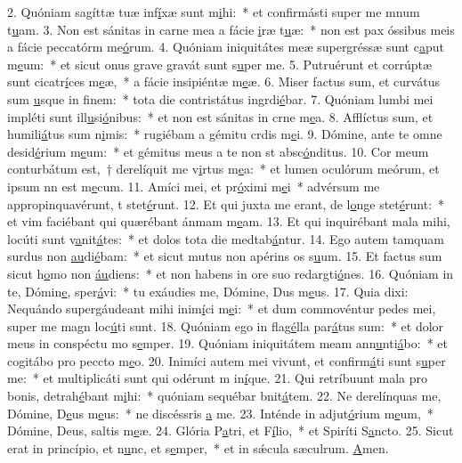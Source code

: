 2. Quóniam sagíttæ tuæ inf\uline{í}xæ sunt m\uline{i}hi:~* et confirmásti super me mnum t\uline{u}am.
3. Non est sánitas in carne mea a fácie \uline{i}ræ t\uline{u}æ:~* non est pax óssibus meis a fácie peccatórm me\uline{ó}rum.
4. Quóniam iniquitátes meæ supergréssæ sunt c\uline{a}put m\uline{e}um:~* et sicut onus grave gravát sunt s\uline{u}per me.
5. Putruérunt et corrúptæ sunt cicatr\uline{í}ces m\uline{e}æ,~* a fácie insipiéntæ m\uline{e}æ.
6. Miser factus sum, et curvátus sum \uline{u}sque in f\uline{i}nem:~* tota die contristátus ingrdi\uline{é}bar.
7. Quóniam lumbi mei impléti sunt ill\uline{u}si\uline{ó}nibus:~* et non est sánitas in crne m\uline{e}a.
8. Afflíctus sum, et humili\uline{á}tus sum n\uline{i}mis:~* rugiébam a gémitu crdis m\uline{e}i.
9. Dómine, ante te omne desid\uline{é}rium m\uline{e}um:~* et gémitus meus a te non st absc\uline{ó}nditus.
10. Cor meum conturbátum est,~† derelíquit me v\uline{i}rtus m\uline{e}a:~* et lumen oculórum meórum, et ipsum nn est m\uline{e}cum.
11. Amíci mei, et pr\uline{ó}ximi m\uline{e}i~* advérsum me appropinquavérunt, t stet\uline{é}runt.
12. Et qui juxta me erant, de l\uline{o}nge stet\uline{é}runt:~* et vim faciébant qui quærébant ánmam m\uline{e}am.
13. Et qui inquirébant mala mihi, locúti sunt v\uline{a}nit\uline{á}tes:~* et dolos tota die medtab\uline{á}ntur.
14. Ego autem tamquam surdus non \uline{au}di\uline{é}bam:~* et sicut mutus non apérins os s\uline{u}um.
15. Et factus sum sicut h\uline{o}mo non \uline{áu}diens:~* et non habens in ore suo redargti\uline{ó}nes.
16. Quóniam in te, Dómin\uline{e}, sper\uline{á}vi:~* tu exáudies me, Dómine, Dus m\uline{e}us.
17. Quia dixi: Nequándo supergáudeant mihi inim\uline{í}ci m\uline{e}i:~* et dum commovéntur pedes mei, super me magn loc\uline{ú}ti sunt.
18. Quóniam ego in flag\uline{é}lla par\uline{á}tus sum:~* et dolor meus in conspéctu mo s\uline{e}mper.
19. Quóniam iniquitátem meam ann\uline{u}nti\uline{á}bo:~* et cogitábo pro peccto m\uline{e}o.
20. Inimíci autem mei vivunt, et confirm\uline{á}ti sunt s\uline{u}per me:~* et multiplicáti sunt qui odérunt m in\uline{í}que.
21. Qui retríbuunt mala pro bonis, detrah\uline{é}bant m\uline{i}hi:~* quóniam sequébar bnit\uline{á}tem.
22. Ne derelínquas me, Dómine, D\uline{e}us m\uline{e}us:~* ne discéssris \uline{a} me.
23. Inténde in adjut\uline{ó}rium m\uline{e}um,~* Dómine, Deus, saltis m\uline{e}æ.
24. Glória P\uline{a}tri, et F\uline{í}lio,~* et Spiríti S\uline{a}ncto.
25. Sicut erat in princípio, et n\uline{u}nc, et s\uline{e}mper,~* et in sǽcula sæculrum. \uline{A}men.
